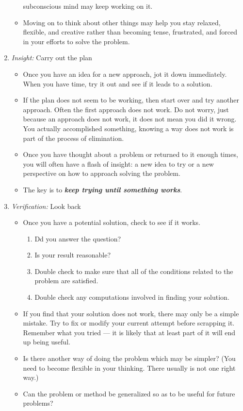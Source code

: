 \begin{enumerate}
\begin{itemize}
            subconscious mind may keep working on it.
      \item Moving on to think about other things may help you stay relaxed, flexible, and creative rather than becoming tense,
            frustrated, and forced in your efforts to solve the problem.
    \end{itemize}
  \item \emph{Insight:} Carry out the plan
    \begin{itemize}
      \item Once you have an idea for a new approach, jot it down immediately. When you have time, try it out and see if it
            leads to a solution.
      \item If the plan does not seem to be working, then start over and try another approach. Often the first approach does not
            work. Do not worry, just because an approach does not work, it  does not mean you did it wrong. You actually accomplished
            something, knowing a way does not work is part of the process of elimination.
      \item Once you have thought about a problem or returned to it enough times, you will often have a flash of insight: a new
            idea to try or a new perspective on how to approach solving the problem.
      \item The key is to \textbf{\emph{keep trying until something works}}.
    \end{itemize}
  \item \emph{Verification: } Look back
    \begin{itemize}
      \item Once you have a potential solution, check to see if it works.
        \begin{enumerate}
          \item Dd you answer the question?
          \item Is your result reasonable?
          \item Double check to make sure that all of the conditions related to the problem are satisfied.
          \item Double check any computations involved in finding your solution.
        \end{enumerate}
      \item If you find that your solution does not work, there may only be a simple mistake. Try to fix or modify your current
            attempt before scrapping it. Remember what you tried --- it is likely that at least part of it will end up being useful.
      \item Is there another way of doing the problem which may be simpler? (You need to become flexible in your thinking. There usually is not one right way.)
      \item Can the problem or method be generalized so as to be useful for future problems?
    \end{itemize}
\end{enumerate}

